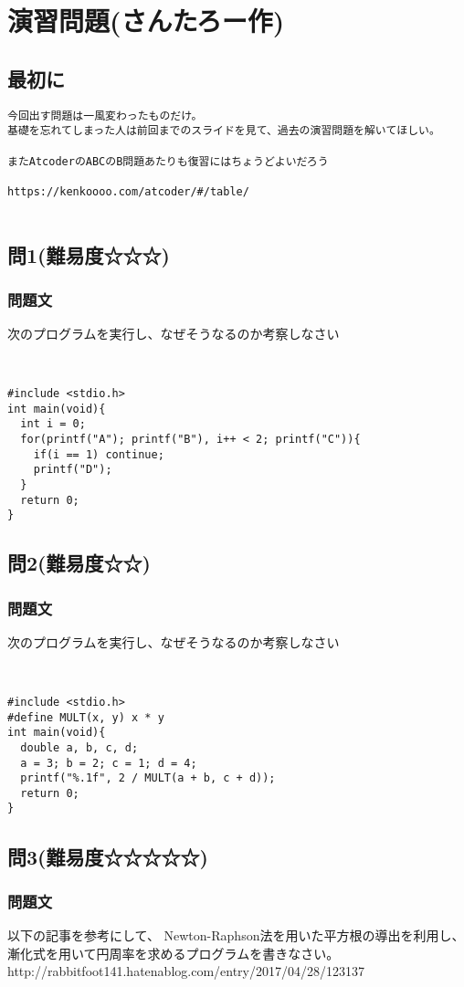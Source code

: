 \section{演習問題(さんたろー作)}
\subsection{最初に}
\begin{verbatim}
今回出す問題は一風変わったものだけ。
基礎を忘れてしまった人は前回までのスライドを見て、過去の演習問題を解いてほしい。

またAtcoderのABCのB問題あたりも復習にはちょうどよいだろう

https://kenkoooo.com/atcoder/#/table/


\end{verbatim}
\subsection{問1(難易度☆☆☆)}
\subsubsection{問題文}
次のプログラムを実行し、なぜそうなるのか考察しなさい
\begin{verbatim}


#include <stdio.h>
int main(void){
  int i = 0;
  for(printf("A"); printf("B"), i++ < 2; printf("C")){
    if(i == 1) continue;
    printf("D");
  }
  return 0;
}
\end{verbatim}

\subsection{問2(難易度☆☆)}
\subsubsection{問題文}
次のプログラムを実行し、なぜそうなるのか考察しなさい
\begin{verbatim}


#include <stdio.h>
#define MULT(x, y) x * y
int main(void){
  double a, b, c, d;
  a = 3; b = 2; c = 1; d = 4;
  printf("%.1f", 2 / MULT(a + b, c + d));
  return 0;
}
\end{verbatim}

\subsection{問3(難易度☆☆☆☆☆)}
\subsubsection{問題文}
以下の記事を参考にして、
Newton-Raphson法を用いた平方根の導出を利用し、
漸化式を用いて円周率を求めるプログラムを書きなさい。\\

http://rabbitfoot141.hatenablog.com/entry/2017/04/28/123137
